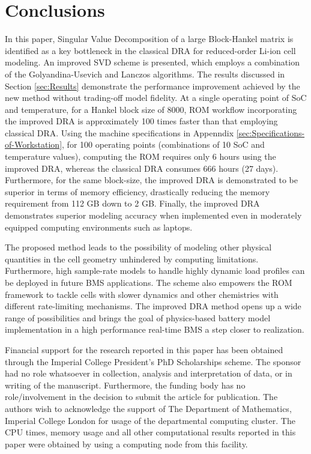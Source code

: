 \begin{figure}
	\caption{}
	\label{time_domain_sim}
\end{figure}

\section{Conclusions\label{sec:Conclusion}}
In this paper, Singular Value Decomposition of a large Block-Hankel
matrix is identified as a key bottleneck in the classical DRA for
reduced-order Li-ion cell modeling. An improved SVD scheme is presented,
which employs a combination of the Golyandina-Usevich and Lanczos
algorithms. The results discussed in Section \ref{sec:Results} demonstrate
the performance improvement achieved by the new method without trading-off
model fidelity. At a single operating point of SoC and temperature,
for a Hankel block size of 8000, ROM workflow incorporating the improved
DRA is approximately 100 times faster than that employing classical
DRA. Using the machine specifications in Appenndix  \ref{sec:Specifications-of-Workstation},
for 100 operating points (combinations of 10 SoC and temperature values),
computing the ROM requires only 6 hours using the improved DRA, whereas
the classical DRA consumes 666 hours (27 days). Furthermore, for the
same block-size, the improved DRA is demonstrated to be superior in
terms of memory efficiency, drastically reducing the memory requirement
from 112 GB down to 2 GB. Finally, the improved DRA demonstrates superior
modeling accuracy when implemented even in moderately equipped computing
environments such as laptops.

The proposed method leads to the possibility of modeling other physical
quantities in the cell geometry unhindered by computing limitations.
Furthermore, high sample-rate models to handle highly dynamic load
profiles can be deployed in future BMS applications. The scheme also
empowers the ROM framework to tackle cells with slower dynamics and
other chemistries with different rate-limiting mechanisms. The improved
DRA method opens up a wide range of possibilities and brings the goal
of physics-based battery model implementation in a high performance
real-time BMS a step closer to realization.

\begin{acknowledgment}
Financial support for the research reported in this paper has been
obtained through the Imperial College President's PhD Scholarships
scheme. The sponsor had no role whatsoever in collection, analysis
and interpretation of data, or in writing of the manuscript. Furthermore,
the funding body has no role/involvement in the decision to submit
the article for publication. The authors wish to acknowledge the support
of The Department of Mathematics, Imperial College London for usage
of the departmental computing cluster. The CPU times, memory usage
and all other computational results reported in this paper were obtained
by using a computing node from this facility.
\end{acknowledgment}


